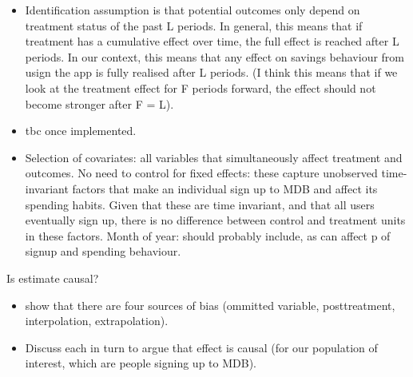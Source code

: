 \begin{itemize}
    \item Identification assumption is that potential outcomes only depend on
        treatment status of the past L periods. In general, this means that if
        treatment has a cumulative effect over time, the full effect is reached
        after L periods. In our context, this means that any effect on savings
        behaviour from usign the app is fully realised after L periods. (I
        think this means that if we look at the treatment effect for F periods
        forward, the effect should not become stronger after F = L).

    \item tbc once implemented.


    \item Selection of covariates: all variables that simultaneously affect
        treatment and outcomes. No need to control for fixed effects: these
        capture unobserved time-invariant factors that make an individual sign
        up to MDB and affect its spending habits. Given that these are time
        invariant, and that all users eventually sign up, there is no
        difference between control and treatment units in these factors. Month
        of year: should probably include, as can affect p of signup and
        spending behaviour.

\end{itemize}





Is estimate causal?
\begin{itemize}
    \item \citet{king2006dangers} show that there are four sources of bias
        (ommitted variable, posttreatment, interpolation, extrapolation).
    
    \item Discuss each in turn to argue that effect is causal (for our population
        of interest, which are people signing up to MDB). 
\end{itemize}


